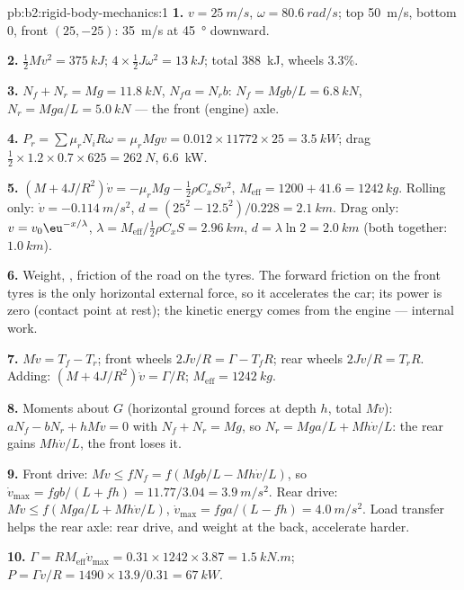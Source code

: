 \begin{solution}{pb:b2:rigid-body-mechanics:1}
\textbf{1.} $v = \qty{25}{m/s}$, $\omega = \qty{80.6}{rad/s}$; top \qty{50}{m/s},
bottom $0$, front $(25, -25)$: \qty{35}{m/s} at \qty{45}{\degree} downward.

\textbf{2.} $\tfrac12Mv^2 = \qty{375}{kJ}$; $4 \times \tfrac12J\omega^2 = \qty{13}{kJ}$;
total \qty{388}{kJ}, wheels $3.3\%$.

\textbf{3.} $N_f + N_r = Mg = \qty{11.8}{kN}$, $N_fa = N_rb$: $N_f = Mgb/L =
\qty{6.8}{kN}$, $N_r = Mga/L = \qty{5.0}{kN}$ --- the front (engine) axle.

\textbf{4.} $P_r = \sum\mu_rN_iR\omega = \mu_rMgv = 0.012 \times 11772 \times 25 =
\qty{3.5}{kW}$; drag $\tfrac12 \times 1.2 \times 0.7 \times 625 = \qty{262}{N}$, \qty{6.6}{kW}.

\textbf{5.} $(M + 4J/R^2)\dot v = -\mu_rMg - \tfrac12\rho C_xSv^2$, $M_{\text{eff}} =
1200 + 41.6 = \qty{1242}{kg}$. Rolling only: $\dot v = \qty{-0.114}{m/s^2}$,
$d = (25^2 - 12.5^2)/0.228 = \qty{2.1}{km}$. Drag only: $v = v_0\eu^{-x/\lambda}$,
$\lambda = M_{\text{eff}}/\tfrac12\rho C_xS = \qty{2.96}{km}$, $d = \lambda\ln2 =
\qty{2.0}{km}$ (both together: $\qty{1.0}{km}$).

\textbf{6.} Weight, , friction of the road on the tyres.
The forward friction on the front tyres is the only horizontal external
force, so it accelerates the car; its power is zero (contact point at
rest); the kinetic energy comes from the engine --- internal work.

\textbf{7.} $M\dot v = T_f - T_r$; front wheels $2J\dot v/R = \Gamma - T_fR$;
rear wheels $2J\dot v/R = T_rR$. Adding: $(M + 4J/R^2)\dot v = \Gamma/R$;
$M_{\text{eff}} = \qty{1242}{kg}$.

\textbf{8.} Moments about $G$ (horizontal ground forces at depth $h$,
total $M\dot v$): $aN_f - bN_r + hM\dot v = 0$ with $N_f + N_r = Mg$, so
$N_r = Mga/L + Mh\dot v/L$: the rear gains $Mh\dot v/L$, the front loses it.

\textbf{9.} Front drive: $M\dot v \le fN_f = f(Mgb/L - Mh\dot v/L)$, so
$\dot v_{\max} = fgb/(L + fh) = 11.77/3.04 = \qty{3.9}{m/s^2}$. Rear drive:
$M\dot v \le f(Mga/L + Mh\dot v/L)$, $\dot v_{\max} = fga/(L - fh) = \qty{4.0}{m/s^2}$.
Load transfer helps the rear axle: rear drive, and weight at the back,
accelerate harder.

\textbf{10.} $\Gamma = RM_{\text{eff}}\dot v_{\max} = 0.31 \times 1242 \times 3.87 =
\qty{1.5}{kN.m}$; $P = \Gamma v/R = 1490 \times 13.9/0.31 = \qty{67}{kW}$.


\end{solution}

